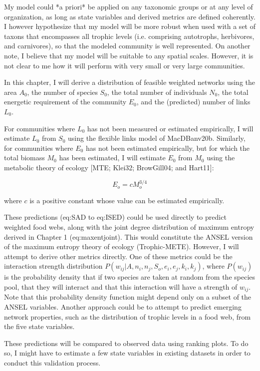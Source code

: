 My model could *a priori* be applied on any taxonomic groups or at any level of
organization, as long as state variables and derived metrics are defined
coherently. I however hypothesize that my model will be more robust when used
with a set of taxons that encompasses all trophic levels (i.e. comprising
autotrophs, herbivores, and carnivores), so that the modeled community is well
represented. On another note, I believe that my model will be suitable to any
spatial scales. However, it is not clear to me how it will perform with very
small or very large communities.

In this chapter, I will derive a distribution of feasible weighted networks
using the area $A_0$, the number of species $S_0$, the total number of
individuals $N_0$, the total energetic requirement of the community $E_0$, and
the (predicted) number of links $L_0$. 

For communities where $L_0$ has not been measured or estimated empirically, I
will estimate $L_0$ from $S_0$ using the flexible links model of MacDBanv20b.
Similarly, for communities where $E_0$ has not been estimated empirically, but
for which the total biomass $M_0$ has been estimated, I will estimate $E_0$ from
$M_0$ using the metabolic theory of ecology [MTE; Klei32; BrowGill04; and
Hart11]:



$$E_o = cM_o^{3/4}$$

where $c$ is a positive constant whose value can be estimated empirically.

These predictions (eq:SAD to eq:ISED) could be used directly to predict
weighted food webs, along with the joint degree distribution of maximum entropy
derived in Chapter 1 (eq:maxentjoint). This would constitute the ANSEL version
of the maximum entropy theory of ecology (Trophic-METE). However, I will attempt
to derive other metrics directly. One of these metrics could be the interaction
strength distribution $P(w_{ij}|A, n_i, n_j, S_o, e_i, e_j, k_i, k_j)$, where
$P(w_{ij})$ is the probability density that if two species are taken at random
from the species pool, that they will interact and that this interaction will
have a strength of $w_{ij}$. Note that this probability density function might
depend only on a subset of the ANSEL variables. Another approach could be to
attempt to predict emerging network properties, such as the distribution of
trophic levels in a food web, from the five state variables.

These predictions will be compared to observed data using ranking plots. To do
so, I might have to estimate a few state variables in existing datasets in order
to conduct this validation process.


